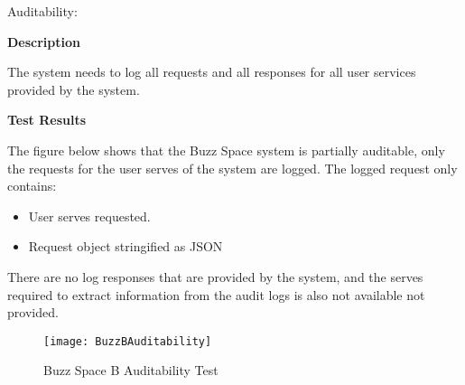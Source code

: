 \newpage
\item Auditability:

\textbf{Description}

The system needs to log all requests and all responses for all user services provided
by the system.

\textbf{Test Results}

The figure below shows that the Buzz Space system is partially auditable, only the requests for the user serves of the system are logged. The logged request only contains:
\begin{itemize}
\item User serves requested.
\item Request object stringified as JSON
\end{itemize}

There are no log responses that are provided by the system, and the serves required to extract information from the audit logs is also not available not provided.

\begin{figure}[h]
  \centering
    \texttt{[image: BuzzBAuditability]}
    \caption{Buzz Space B Auditability Test}
\end{figure}
